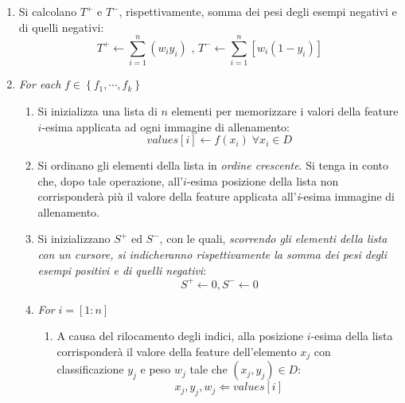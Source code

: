             \begin{enumerate}
                \item Si calcolano $T^+$ e $T^-$, rispettivamente, somma dei pesi degli esempi negativi e di quelli negativi:
                \begin{equation}
                    \label{subeq:weight_total_sums}
                    T^+ \leftarrow \sum_{i = 1}^{n} (w_i y_i)
                    \text{ , }
                    T^- \leftarrow \sum_{i = 1}^{n} \left[w_i (1 - y_i)\right]
                \end{equation}

                \item \emph{For each} $f \in \left\{f_1, \cdots, f_k\right\}$

                \begin{enumerate}
                    \item Si inizializza una lista di $n$ elementi per memorizzare i valori della feature $i$-esima applicata ad ogni immagine di allenamento:
                    \begin{equation}
                        \label{subeq:element_list_initialization}
                        values[i] \leftarrow f(x_i) \; \forall x_i \in D
                    \end{equation}

                    \item Si ordinano gli elementi della lista in \emph{ordine crescente}. 
                    Si tenga in conto che, dopo tale operazione, all'$i$-esima posizione della lista non corrisponderà più il valore della feature applicata all'\emph{i}-esima immagine di allenamento.

                    \item Si inizializzano $S^+$ ed $S^-$, con le quali, \emph{scorrendo gli elementi della lista con un cursore, si indicheranno rispettivamente la somma dei pesi degli esempi positivi e di quelli negativi}:
                    \begin{equation}
                        \label{subeq:partial_sum_initialization}
                        S^+ \leftarrow 0, S^- \leftarrow 0
                    \end{equation}

                    \item \emph{For} $i = [1:n]$

                    \begin{enumerate}
                        \item A causa del rilocamento degli indici, alla posizione $i$-esima della lista corrisponderà il valore della feature dell'elemento $x_j$ con classificazione $y_j$ e peso $w_j$ tale che $(x_j, y_j) \in D$:
                        \begin{equation}
                            \label{subeq:indices_relocation}
                            x_j, y_j, w_j \Leftarrow values[i]
                        \end{equation}


\end{enumerate}
\end{enumerate}
\end{enumerate}
